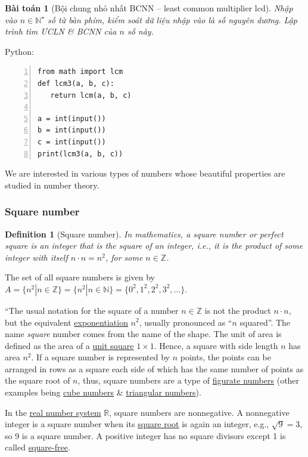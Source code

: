 \documentclass{article}
\newtheorem{baitoan}{Bài toán}
\newtheorem{definition}{Definition}
\begin{document}
\begin{baitoan}[Bội chung nhỏ nhất BCNN -- least common multiplier lcd]
	Nhập vào $n\in\mathbb{N}^\star$ số từ bàn phím, kiểm soát dữ liệu nhập vào là số nguyên dương. Lập trình tìm \emph{ƯCLN} \& \emph{BCNN} của $n$ số này.
\end{baitoan}
Python:
\begin{Verbatim}[numbers=left,xleftmargin=5mm]
from math import lcm
def lcm3(a, b, c):
   return lcm(a, b, c)

a = int(input())
b = int(input())
c = int(input())
print(lcm3(a, b, c))
\end{Verbatim}
We are interested in various types of numbers whose beautiful properties are studied in number theory.

\subsubsection{Square number}

\begin{definition}[Square number]
	In mathematics, a \emph{square number} or \emph{perfect square} is an integer that is the square of an integer, i.e., it is the product of some integer with itself $n\cdot n = n^2$, for some $n\in\mathbb{Z}$. 
\end{definition}
The set of all square numbers is given by $A = \{n^2|n\in\mathbb{Z}\} = \{n^2|n\in\mathbb{N}\} = \{0^2,1^2,2^2,3^2,\ldots\}$.
 
``The usual notation for the square of a number $n\in\mathbb{Z}$ is not the product $n\cdot n$, but the equivalent \href{https://en.wikipedia.org/wiki/Exponentiation}{exponentiation} $n^2$, usually pronounced as ``$n$ squared''. The name \textit{square} number comes from the name of the shape. The unit of area is defined as the area of a \href{https://en.wikipedia.org/wiki/Unit_square}{unit square} $1\times1$. Hence, a square with side length $n$ has area $n^2$. If a square number is represented by $n$ points, the points can be arranged in rows as a square each side of which has the same number of points as the square root of $n$, thus, square numbers are a type of \href{https://en.wikipedia.org/wiki/Figurate_number}{figurate numbers} (other examples being \href{https://en.wikipedia.org/wiki/Cube_(algebra)}{cube numbers} \& \href{https://en.wikipedia.org/wiki/Triangular_numbers}{triangular numbers}).

In the \href{https://en.wikipedia.org/wiki/Real_number}{real number system} $\mathbb{R}$, square numbers are nonnegative. A nonnegative integer is a square number when its \href{https://en.wikipedia.org/wiki/Square_root}{square root} is again an integer, e.g., $\sqrt{9} = 3$, so 9 is a square number. A positive integer has no square divisors except 1 is called \href{https://en.wikipedia.org/wiki/Square-free_integer}{square-free}.
\end{document}
